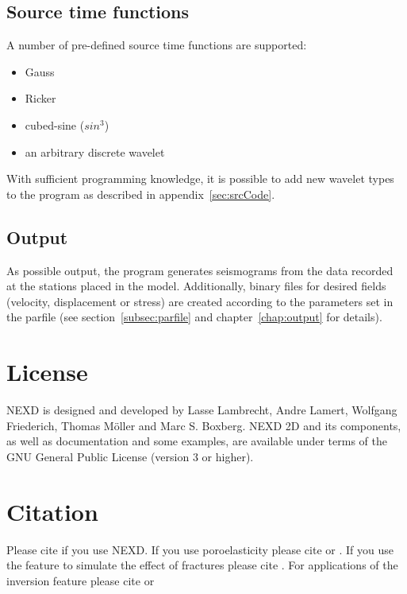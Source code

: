     \subsection{Source time functions}  
    A number of pre-defined source time functions are supported:
    \begin{itemize}
        \item Gauss
        \item Ricker
        \item cubed-sine ($sin^3$)
        \item an arbitrary discrete wavelet
    \end{itemize}       
    With sufficient programming knowledge, it is possible to add new wavelet types to the program as described in appendix~\ref{sec:srcCode}.   
      
    \subsection{Output}
    As possible output, the program generates seismograms from the data recorded at the stations placed in the model. Additionally, binary files for desired fields (velocity, displacement or stress) are created according to the parameters set in the parfile (see section~\ref{subsec:parfile} and chapter~\ref{chap:output} for details).
			     
\section{License}
NEXD is designed and developed by Lasse Lambrecht, Andre Lamert, Wolfgang Friederich, Thomas M{\"o}ller and Marc S. Boxberg. NEXD 2D and its components, as well as documentation and some examples, are available under terms of the GNU General Public License (version 3 or higher).

\section{Citation}
Please cite \cite{Lambrecht.2017} if you use NEXD. If you use poroelasticity please cite \cite{Boxberg.2017} or \cite{Boxberg.2019}. If you use the feature to simulate the effect of fractures please cite \cite{Moeller.2019}. For applications of the inversion feature please cite \cite{Lamert.2020} or \cite{Lamert.2019}